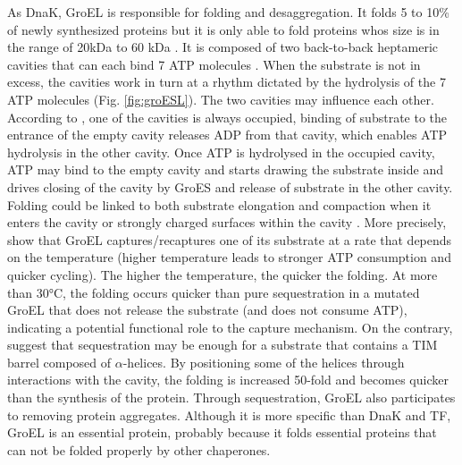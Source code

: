 As DnaK, GroEL is responsible for folding and desaggregation. It folds 5 to 10\% of newly synthesized proteins  but it is only able to fold proteins whos size is in the range of 20kDa to 60 kDa \citep{castanie-cornet_chaperone_2014}. It is composed of two back-to-back heptameric cavities that can each bind 7 ATP molecules \citep{georgescauld_groel/es_2014}. When the substrate is not in excess, the cavities work in turn at a rhythm dictated by the hydrolysis of the 7 ATP molecules (Fig. \ref{fig:groESL}). The two cavities may influence each other. According to  \citet{lin_repetitive_2013}, one of the cavities is always occupied, binding of substrate to the entrance of the empty cavity releases ADP from that cavity, which enables ATP hydrolysis in the other cavity. Once ATP is hydrolysed in the occupied cavity, ATP may bind to the empty cavity and starts drawing the substrate inside and drives closing of the cavity by GroES and release of substrate in the other cavity. Folding could be linked to both substrate elongation and compaction when it enters the cavity \citep{lim_evidence_2014} or strongly charged surfaces within the cavity \citep{georgescauld_groel/es_2014}. More precisely, \citet{lim_evidence_2014} show that GroEL captures/recaptures one of its substrate at a rate that depends on the temperature (higher temperature leads to stronger ATP consumption and quicker cycling). The higher the temperature, the quicker the folding. At more than 30°C, the folding occurs quicker than pure sequestration in a mutated GroEL that does not release the substrate (and does not consume ATP), indicating a potential functional role to the capture mechanism. On the contrary, \citet{georgescauld_groel/es_2014} suggest that sequestration may be enough for a substrate that contains a TIM barrel composed of $\alpha$-helices. By positioning some of the helices through interactions with the cavity, the folding is increased 50-fold and becomes quicker than the synthesis of the protein. Through sequestration, GroEL also participates to removing protein aggregates. Although it is more specific than DnaK and TF, GroEL is an essential protein, probably because it folds essential proteins that can not be folded properly by other chaperones.

